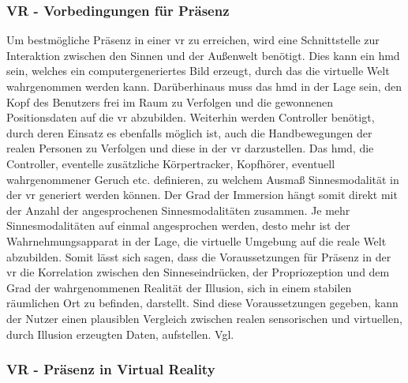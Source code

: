 \documentclass[a4paper,11pt]{article}%
\renewcommand{\\}{\vspace*{0.5\baselineskip} \newline}
\begin{document}
		\subsubsection{VR - Vorbedingungen für Präsenz}
Um bestmögliche Präsenz in einer \ac{vr} zu erreichen, wird eine Schnittstelle zur Interaktion zwischen den Sinnen und der Außenwelt benötigt. Dies kann ein \ac{hmd} sein, welches ein computergeneriertes Bild erzeugt, durch das die virtuelle Welt wahrgenommen werden kann. Darüberhinaus muss das \ac{hmd} in der Lage sein, den Kopf des Benutzers frei im Raum zu Verfolgen und die gewonnenen Positionsdaten auf die \ac{vr} abzubilden. Weiterhin werden Controller benötigt, durch deren Einsatz es ebenfalls möglich ist, auch die Handbewegungen der realen Personen zu Verfolgen und diese in der \ac{vr} darzustellen. Das \ac{hmd}, die Controller, eventelle zusätzliche Körpertracker, Kopfhörer, eventuell wahrgenommener Geruch etc. definieren, zu welchem Ausmaß Sinnesmodalität in der \ac{vr} generiert werden können. Der Grad der Immersion hängt somit direkt mit der Anzahl der angesprochenen Sinnesmodalitäten zusammen. Je mehr Sinnesmodalitäten auf einmal angesprochen werden, desto mehr ist der Wahrnehmungsapparat in der Lage, die virtuelle Umgebung auf die reale Welt abzubilden. \\
Somit lässt sich sagen, dass die Voraussetzungen für Präsenz in der \ac{vr} die Korrelation zwischen den Sinneseindrücken, der Propriozeption und dem Grad der wahrgenommenen Realität der Illusion, sich in einem stabilen räumlichen Ort zu befinden, darstellt. Sind diese Voraussetzungen gegeben, kann der Nutzer einen plausiblen Vergleich zwischen realen sensorischen und virtuellen, durch Illusion erzeugten Daten, aufstellen. Vgl. \citep{slater2009we}

		\subsubsection{VR - Präsenz in Virtual Reality}
			
\end{document}

